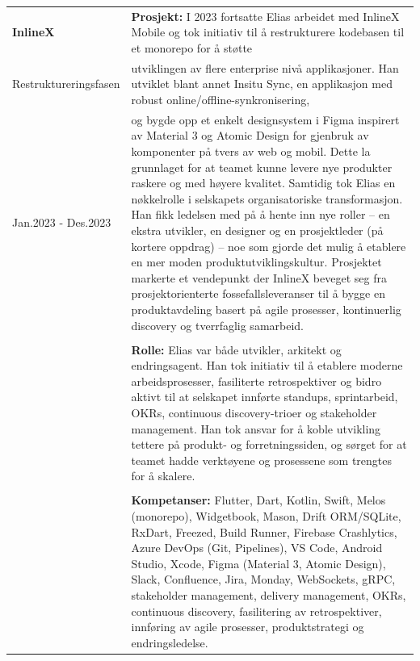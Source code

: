 \documentclass[a4paper,10pt]{article}
\begin{document}
\vspace{2em}

\noindent
\begin{longtable}{@{}p{4cm}p{11cm}@{}}  %
\textbf{InlineX}
& \textbf{Prosjekt:} I 2023 fortsatte Elias arbeidet med InlineX Mobile og tok  initiativ til å restrukturere kodebasen til et monorepo for å støtte \\
Restruktureringsfasen & utviklingen av flere enterprise nivå applikasjoner. Han utviklet blant annet Insitu Sync,  en applikasjon med robust online/offline-synkronisering,\\
Jan.2023 - Des.2023 & og bygde opp et enkelt designsystem i Figma inspirert av Material 3 og Atomic Design for gjenbruk av komponenter på tvers av web og mobil. Dette la grunnlaget for at teamet kunne levere nye produkter raskere og med høyere kvalitet. Samtidig tok Elias en nøkkelrolle i selskapets organisatoriske transformasjon. Han fikk ledelsen med på å hente inn nye roller – en ekstra utvikler, en designer og en prosjektleder (på kortere oppdrag) – noe som gjorde det mulig å etablere en mer moden produktutviklingskultur. Prosjektet markerte et vendepunkt der InlineX beveget seg fra prosjektorienterte fossefallsleveranser til å bygge en produktavdeling basert på agile prosesser, kontinuerlig discovery og tverrfaglig samarbeid.\\
& \\
& \textbf{Rolle:} Elias var både utvikler, arkitekt og endringsagent. Han tok initiativ til å etablere moderne arbeidsprosesser, fasiliterte retrospektiver og bidro aktivt til at selskapet innførte standups, sprintarbeid, OKRs, continuous discovery-trioer og stakeholder management. Han tok ansvar for å koble utvikling tettere på produkt- og forretningssiden, og sørget for at teamet hadde verktøyene og prosessene som trengtes for å skalere. \\
& \\
& \textbf{Kompetanser:} Flutter, Dart, Kotlin, Swift, Melos (monorepo), Widgetbook, Mason, Drift ORM/SQLite, RxDart, Freezed, Build Runner, Firebase Crashlytics, Azure DevOps (Git, Pipelines), VS Code, Android Studio, Xcode, Figma (Material 3, Atomic Design), Slack, Confluence, Jira, Monday, WebSockets, gRPC, stakeholder management, delivery management, OKRs, continuous discovery, fasilitering av retrospektiver, innføring av agile prosesser, produktstrategi og endringsledelse. \\
\end{longtable}
\end{document}
